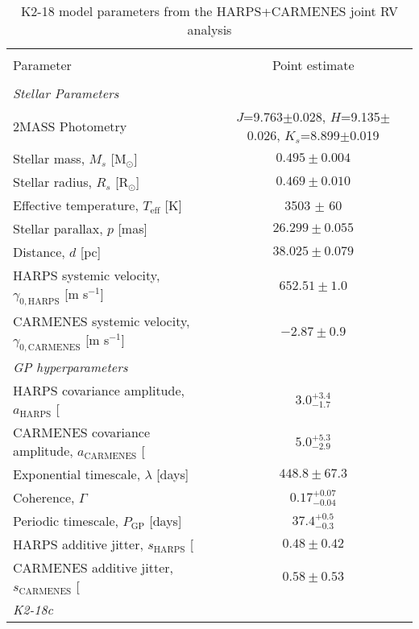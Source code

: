 \begin{table*}
\small
\renewcommand{\arraystretch}{0.7}
\centering
\caption{K2-18 model parameters from the HARPS+CARMENES joint RV analysis}
\label{k2182table:k218}
\begin{tabular}{lc}
\hline \\ [-1ex]
Parameter & Point estimate \smallskip\\
\hline \\ [-1ex]
\emph{Stellar Parameters} & \smallskip \\
2MASS Photometry & $J$=9.763$\pm$0.028, $H$=9.135$\pm$0.026, $K_s$=8.899$\pm$0.019 \\
Stellar mass, $M_s$ [M$_{\odot}$]  &  $0.495\pm 0.004$ \\
Stellar radius, $R_s$ [R$_{\odot}$]  &  $0.469\pm 0.010$  \\
Effective temperature, $T_{\text{eff}}$ [K]  & 3503 $\pm$ 60 \\
Stellar parallax, $p$ [mas] & $26.299\pm 0.055$ \\
Distance, $d$ [pc] & $38.025 \pm 0.079$ \\
HARPS systemic velocity, $\gamma_{0,\text{HARPS}}$ [m s$^{-1}$] & $652.51 \pm 1.0$ \\
CARMENES systemic velocity, $\gamma_{0,\text{CARMENES}}$ [m s$^{-1}$] & $-2.87\pm 0.9$ \medskip \\
\emph{GP hyperparameters} & \smallskip \\
HARPS covariance amplitude, $a_{\text{HARPS}}$ [\mps{]} & $3.0^{+3.4}_{-1.7}$  \\
CARMENES covariance amplitude, $a_{\text{CARMENES}}$ [\mps{]} & $5.0^{+5.3}_{-2.9}$ \\
Exponential timescale, $\lambda$ [days] &  $448.8\pm 67.3$ \\
Coherence, $\Gamma$ &  $0.17^{+0.07}_{-0.04}$ \\
Periodic timescale, $P_{\text{GP}}$ [days] & $37.4^{+0.5}_{-0.3}$ \\
HARPS additive jitter, $s_{\text{HARPS}}$ [\mps{]} & $0.48\pm 0.42$ \\
CARMENES additive jitter, $s_{\text{CARMENES}}$ [\mps{]} & $0.58\pm 0.53$ \medskip \\
\emph{K2-18c} & \smallskip \\

\end{tabular}
\end{table*}
